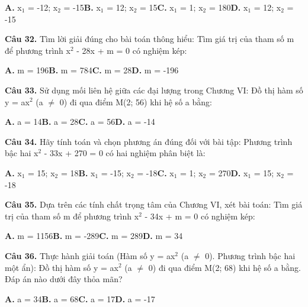 \documentclass[11pt,a4paper]{article}
\begin{document}
\hspace*{1.5em}\textbf{A.} x$_1$ = -12; x$_2$ = -15\quad\quad \textbf{B.} x$_1$ = 12; x$_2$ = 15\quad\quad \textbf{C.} x$_1$ = 1; x$_2$ = 180\quad\quad \textbf{D.} x$_1$ = 12; x$_2$ = -15\par\vspace{2pt}
\textbf{\color{primary} Câu 32.} Tìm lời giải đúng cho bài toán thông hiểu: Tìm giá trị của tham số m để phương trình x$^2$ - 28x + m = 0 có nghiệm kép:\par
\hspace*{1.5em}\textbf{A.} m = 196\quad\quad \textbf{B.} m = 784\quad\quad \textbf{C.} m = 28\quad\quad \textbf{D.} m = -196\par\vspace{2pt}
\textbf{\color{primary} Câu 33.} Sử dụng mối liên hệ giữa các đại lượng trong Chương VI: Đồ thị hàm số y = ax$^2$ (a $\ne$ 0) đi qua điểm M(2; 56) khi hệ số a bằng:\par
\hspace*{1.5em}\textbf{A.} a = 14\quad\quad \textbf{B.} a = 28\quad\quad \textbf{C.} a = 56\quad\quad \textbf{D.} a = -14\par\vspace{2pt}
\textbf{\color{primary} Câu 34.} Hãy tính toán và chọn phương án đúng đối với bài tập: Phương trình bậc hai x$^2$ - 33x + 270 = 0 có hai nghiệm phân biệt là:\par
\hspace*{1.5em}\textbf{A.} x$_1$ = 15; x$_2$ = 18\quad\quad \textbf{B.} x$_1$ = -15; x$_2$ = -18\quad\quad \textbf{C.} x$_1$ = 1; x$_2$ = 270\quad\quad \textbf{D.} x$_1$ = 15; x$_2$ = -18\par\vspace{2pt}
\textbf{\color{primary} Câu 35.} Dựa trên các tính chất trọng tâm của Chương VI, xét bài toán: Tìm giá trị của tham số m để phương trình x$^2$ - 34x + m = 0 có nghiệm kép:\par
\hspace*{1.5em}\textbf{A.} m = 1156\quad\quad \textbf{B.} m = -289\quad\quad \textbf{C.} m = 289\quad\quad \textbf{D.} m = 34\par\vspace{2pt}
\textbf{\color{primary} Câu 36.} Thực hành giải toán (Hàm số y = ax$^2$ (a $\ne$ 0). Phương trình bậc hai một ẩn): Đồ thị hàm số y = ax$^2$ (a $\ne$ 0) đi qua điểm M(2; 68) khi hệ số a bằng. Đáp án nào dưới đây thỏa mãn?\par
\hspace*{1.5em}\textbf{A.} a = 34\quad\quad \textbf{B.} a = 68\quad\quad \textbf{C.} a = 17\quad\quad \textbf{D.} a = -17\par\vspace{2pt}
\end{document}
